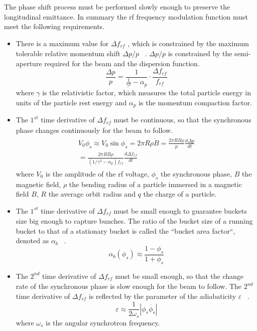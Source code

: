 The phase shift process must be performed slowly enough to preserve the longitudinal emittance. In summary the rf frequency modulation function must meet the following requirements.   
\begin{itemize}
	\item There is a maximum value for $\Delta f_\mathit{rf}$ , which is constrained by the maximum tolerable relative momentum shift $\Delta p/p$ ~\cite{bovet_selection_1970}. $\Delta p/p$ is constrained by the semi-aperture required for the beam and the dispersion function. 
\begin{equation}
\frac{\Delta{p}}{p}  = \frac{1}{\frac{1}{\gamma^2}-\alpha_{\mathit{p}}}\cdot \frac{\Delta f_{\mathit{rf}}}{f_{\mathit{rf}}}
\label{eq:phaseP11}
\end{equation}
where $\gamma$ is the relativistic factor, which measures the total particle energy in units of the particle rest energy and $\alpha_{\mathit{p}}$ is the momentum compaction factor.

	\item The $1^\mathit{st}$ time derivative of $\Delta f_\mathit{rf}$ must be continuous, so that the synchronous phase changes continuously for the beam to follow. 
\begin{eqnarray}
\begin{aligned}
	V_0\phi_s\approx V_0\sin\phi_s=2\pi R\rho\dot{B}=\frac{2\pi R B\rho}{p} \frac{d \Delta p}{dt}\\=\frac{2\pi R B\rho}{(1/\gamma^2-\alpha_p)f_\mathit{rf}} \frac{d \Delta f_\mathit{rf}}{dt}
\end{aligned}
\end{eqnarray}
where $V_0$ is the amplitude of the rf voltage, $\phi_s$ the synchronous phase, $B$ the magnetic field, $\rho$ the bending radius of a particle immersed in a magnetic field $B$, $R$ the average orbit radius and $q$ the charge of a particle.
	\item The $1^\mathit{st}$ time derivative of $\Delta f_\mathit{rf}$ must be small enough to guarantee buckets size big enough to capture bunches. 
The ratio of the bucket size of a running bucket to that of a stationary bucket is called the ``bucket area factor``, denoted as $\alpha_b$ ~\cite{lee_accelerator_2011}.
\begin{equation} 
\label{bucket_size}
\alpha_b(\phi_{s})\approx \frac{1-\phi_{s}}{1+\phi_{s}}
\end{equation} 
	\item The $2^\mathit{nd}$ time derivative of $\Delta f_\mathit{rf}$ must be small enough, so that the change rate of the synchronous phase is slow enough for the beam to follow. The $2^\mathit{nd}$ time derivative of $\Delta f_\mathit{rf}$ is reflected by the parameter of the adiabaticity $\varepsilon$ ~\cite{ezura_beam-dynamics_2008}.
\begin{equation}
\varepsilon \approx \frac{1}{2\omega_s}|\phi_s\dot{\phi_{s}}|
\label{eq:derivation1}
\end{equation} 
where $\omega_s$ is the angular synchrotron frequency.
\end{itemize}

